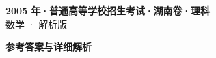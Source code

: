 \documentclass[zihao=-4, a4paper]{ctexart}
\begin{document}
\begin{center}
  {\Large\bfseries 2005 年·普通高等学校招生考试·湖南卷·理科}\\[4pt]
  {\large 数学 · 解析版}
\end{center}
\medskip
{}

\clearpage
{}
\begin{center}{\Large\bfseries 参考答案与详细解析}\end{center}
\medskip

\end{document}
